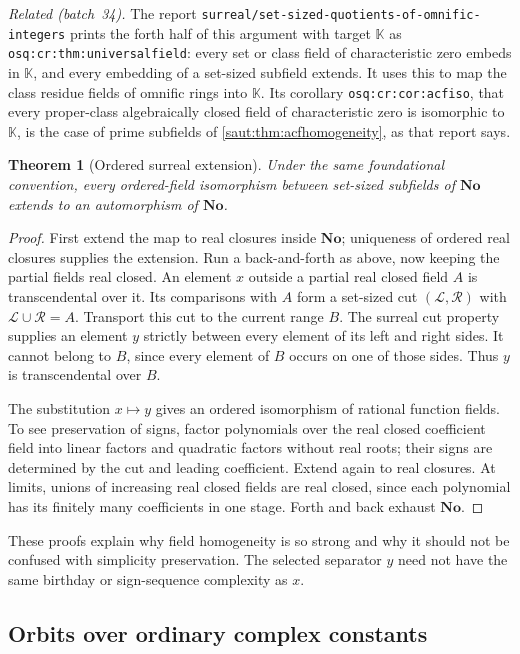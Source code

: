 \documentclass[11pt]{article}
\newtheorem{theorem}{Theorem}[section]
\theoremstyle{definition}
\theoremstyle{remark}
\newcommand{\No}{\mathbf{No}}
\newcommand{\K}{\mathbb K}
\newcommand{\repo}[1]{\nolinkurl{#1}}%
\newcommand{\lbl}[1]{\nolinkurl{#1}}%
\numberwithin{equation}{section}
\begin{document}
\emph{Related (batch~34).} The report
\repo{surreal/set-sized-quotients-of-omnific-integers} prints the forth half
of this argument with target $\K$ as \lbl{osq:cr:thm:universalfield}: every
set or class field of characteristic zero embeds in $\K$, and every
embedding of a set-sized subfield extends. It uses this to map the class
residue fields of omnific rings into $\K$. Its corollary
\lbl{osq:cr:cor:acfiso}, that every proper-class algebraically closed field
of characteristic zero is isomorphic to $\K$, is the case of prime subfields
of \cref{saut:thm:acfhomogeneity}, as that report says.

\begin{theorem}[Ordered surreal extension]\label{saut:thm:orderedhomogeneity}
Under the same foundational convention, every ordered-field isomorphism
between set-sized subfields of $\No$ extends to an automorphism of $\No$.
\end{theorem}
\begin{proof}
First extend the map to real closures inside $\No$; uniqueness of ordered
real closures supplies the extension. Run a back-and-forth as above, now
keeping the partial fields real closed. An element $x$ outside a partial
real closed field $A$ is transcendental over it. Its comparisons with $A$
form a set-sized cut $(\mathcal L,\mathcal R)$ with $\mathcal L\cup\mathcal R=A$.
Transport this cut to the current range $B$. The surreal cut property
supplies an element $y$ strictly between every element of its left and
right sides. It cannot belong to $B$, since every element of $B$ occurs
on one of those sides. Thus $y$ is transcendental over $B$.

The substitution $x\mapsto y$ gives an ordered isomorphism of rational
function fields. To see preservation of signs, factor polynomials over
the real closed coefficient field into linear factors and quadratic
factors without real roots; their signs are determined by the cut and
leading coefficient. Extend again to real closures. At limits, unions of
increasing real closed fields are real closed, since each polynomial has
its finitely many coefficients in one stage. Forth and back exhaust $\No$.
\end{proof}

These proofs explain why field homogeneity is so strong and why it should
not be confused with simplicity preservation. The selected separator $y$
need not have the same birthday or sign-sequence complexity as $x$.

\subsection{Orbits over ordinary complex constants}
\end{document}
